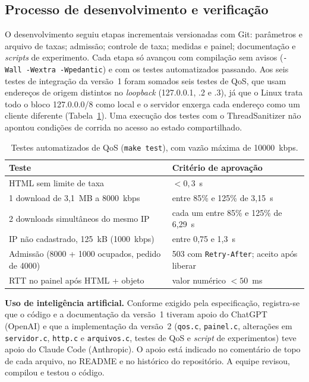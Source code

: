 \documentclass[12pt,a4paper]{article}
\begin{document}
\subsection{Processo de desenvolvimento e verificação}

O desenvolvimento seguiu etapas incrementais versionadas com Git: parâmetros e arquivo de
taxas; admissão; controle de taxa; medidas e painel; documentação e \textit{scripts} de
experimento. Cada etapa só avançou com compilação sem avisos
(\texttt{-Wall -Wextra -Wpedantic}) e com os testes automatizados passando. Aos seis
testes de integração da versão~1 foram somados seis testes de QoS, que usam endereços de
origem distintos no \textit{loopback} (127.0.0.1, .2 e .3), já que o Linux trata todo o
bloco 127.0.0.0/8 como local e o servidor enxerga cada endereço como um cliente diferente
(Tabela~\ref{tab:testes}). Uma execução dos testes com o ThreadSanitizer não apontou
condições de corrida no acesso ao estado compartilhado.

\begin{table}[H]
\centering
\caption{Testes automatizados de QoS (\texttt{make test}), com vazão máxima de 10000~kbps.}
\label{tab:testes}
\small
\begin{tabularx}{\linewidth}{@{}Xl@{}}
\toprule
Teste & Critério de aprovação \\
\midrule
HTML sem limite de taxa & $< 0{,}3$~s \\
1 download de 3{,}1~MB a 8000~kbps & entre 85\% e 125\% de 3{,}15~s \\
2 downloads simultâneos do mesmo IP & cada um entre 85\% e 125\% de 6{,}29~s \\
IP não cadastrado, 125~kB (1000~kbps) & entre 0{,}75 e 1{,}3~s \\
Admissão (8000 + 1000 ocupados, pedido de 4000) & 503 com \texttt{Retry-After}; aceito após liberar \\
RTT no painel após HTML + objeto & valor numérico $< 50$~ms \\
\bottomrule
\end{tabularx}
\end{table}

\textbf{Uso de inteligência artificial.} Conforme exigido pela especificação, registra-se
que o código e a documentação da versão~1 tiveram apoio do ChatGPT (OpenAI) e que a
implementação da versão~2 (\texttt{qos.c}, \texttt{painel.c}, alterações em
\texttt{servidor.c}, \texttt{http.c} e \texttt{arquivos.c}, testes de QoS e
\textit{script} de experimentos) teve apoio do Claude Code (Anthropic). O apoio está
indicado no comentário de topo de cada arquivo, no README e no histórico do repositório.
A equipe revisou, compilou e testou o código.
\end{document}
